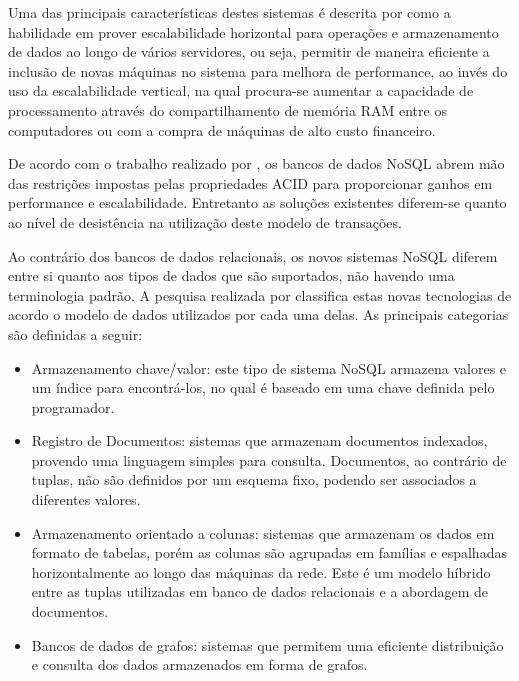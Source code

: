 Uma das principais características destes sistemas é descrita por  como a habilidade em prover escalabilidade horizontal para operações e armazenamento de dados ao longo de vários servidores, ou seja, permitir de maneira eficiente a inclusão de novas máquinas no sistema para melhora de performance, ao invés do uso da escalabilidade vertical, na qual procura-se aumentar a capacidade de processamento através do compartilhamento de memória RAM entre os computadores ou com a compra de máquinas de alto custo financeiro.

De acordo com o trabalho realizado por , os bancos de dados NoSQL abrem mão das restrições impostas pelas propriedades ACID para proporcionar ganhos em performance e escalabilidade. Entretanto as soluções existentes diferem-se quanto ao nível de desistência na utilização deste modelo de transações.

Ao contrário dos bancos de dados relacionais, os novos sistemas NoSQL diferem entre si quanto aos tipos de dados que são suportados, não havendo uma terminologia padrão. A pesquisa realizada por  classifica estas novas tecnologias de acordo o modelo de dados utilizados por cada uma delas. As principais categorias são definidas a seguir:

\begin{itemize}

  \item{Armazenamento chave/valor: este tipo de sistema NoSQL armazena valores e um índice para encontrá-los, no qual é baseado em uma chave definida pelo programador.}
  \item{Registro de Documentos: sistemas que armazenam documentos indexados, provendo uma linguagem simples para consulta. Documentos, ao contrário de tuplas, não são definidos por um esquema fixo, podendo ser associados a diferentes valores.}
  \item{Armazenamento orientado a colunas: sistemas que armazenam os dados em formato de tabelas, porém as colunas são agrupadas em famílias e espalhadas horizontalmente ao longo das máquinas da rede. Este é um modelo híbrido entre as tuplas utilizadas em banco de dados relacionais e a abordagem de documentos.}
  \item{Bancos de dados de grafos: sistemas que permitem uma eficiente distribuição e consulta dos dados armazenados em forma de grafos.}

\end{itemize}

